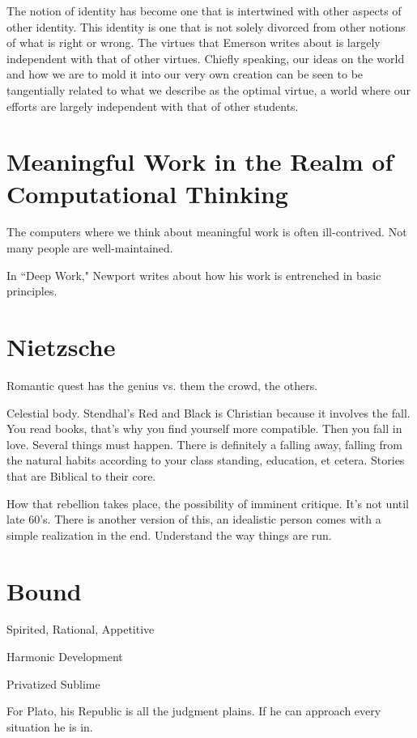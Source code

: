 \documentclass[12pt,letterpaper]{article}
\begin{document}
The notion of identity has become one that is intertwined with other aspects of other identity.  This identity is one that is not solely divorced from other notions of what is right or wrong.  The virtues that Emerson writes about is largely independent with that of other virtues.  Chiefly speaking, our ideas on the world and how we are to mold it into our very own creation can be seen to be tangentially related to what we describe as the optimal virtue, a world where our efforts are largely independent with that of other students.

\section{Meaningful Work in the Realm of Computational Thinking}
The computers where we think about meaningful work is often ill-contrived.  Not many people are well-maintained. 

In ``Deep Work," Newport writes about how his work is entrenched in basic principles.


\section{Nietzsche}

Romantic quest has the genius vs. them the crowd, the others.

Celestial body.  Stendhal's Red and Black is Christian because it involves the fall.  You read books, that's why you find yourself more compatible.  Then you fall in love.  Several things must happen.  There is definitely a falling away, falling from the natural habits according to your class standing, education, et cetera.  Stories that are Biblical to their core.

How that rebellion takes place, the possibility of imminent critique.  It's not until late 60's.  There is another version of this, an idealistic person comes with a simple realization in the end.  Understand the way things are run.

\section{Bound}

Spirited, Rational, Appetitive

Harmonic Development

Privatized Sublime


For Plato, his Republic is all the judgment plains.  If he can approach every situation he is in.  
\fi
\end{document}
